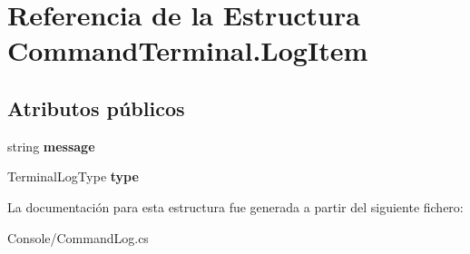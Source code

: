 \hypertarget{struct_command_terminal_1_1_log_item}{}\section{Referencia de la Estructura Command\+Terminal.\+Log\+Item}
\label{struct_command_terminal_1_1_log_item}
\subsection*{Atributos públicos}
\begin{DoxyCompactItemize}
\item 
\mbox{\label{struct_command_terminal_1_1_log_item_aa6e8325373743db2f9ac2cf18aa646ee}} 
string {\bfseries message}
\item 
\mbox{\label{struct_command_terminal_1_1_log_item_ac983be4b160b4b77ebd4413ae3d9bf15}} 
Terminal\+Log\+Type {\bfseries type}
\end{DoxyCompactItemize}


La documentación para esta estructura fue generada a partir del siguiente fichero\+:\begin{DoxyCompactItemize}
\item 
Console/Command\+Log.\+cs\end{DoxyCompactItemize}
